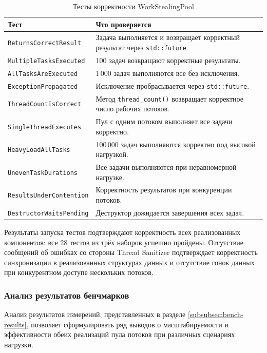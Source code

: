 \begin{table}[h]
\caption{Тесты корректности WorkStealingPool}
\label{tab:tests-ws}
\begin{tabularx}{\textwidth}{|l|X|}
\hline
Тест & Что проверяется \\
\hline
\texttt{ReturnsCorrectResult} &
Задача выполняется и возвращает корректный результат
через \texttt{std::future}. \\
\hline
\texttt{MultipleTasksExecuted} &
100 задач возвращают корректные результаты. \\
\hline
\texttt{AllTasksAreExecuted} &
1\,000 задач выполняются все без исключения. \\
\hline
\texttt{ExceptionPropagated} &
Исключение пробрасывается через \texttt{std::future}. \\
\hline
\texttt{ThreadCountIsCorrect} &
Метод \texttt{thread\_count()} возвращает корректное
число рабочих потоков. \\
\hline
\texttt{SingleThreadExecutes} &
Пул с одним потоком выполняет все задачи корректно. \\
\hline
\texttt{HeavyLoadAllTasks} &
100\,000 задач выполняются корректно под высокой
нагрузкой. \\
\hline
\texttt{UnevenTaskDurations} &
Все задачи выполняются при неравномерной нагрузке. \\
\hline
\texttt{ResultsUnderContention} &
Корректность результатов при конкуренции потоков. \\
\hline
\texttt{DestructorWaitsPending} &
Деструктор дожидается завершения всех задач. \\
\hline
\end{tabularx}
\end{table}

Результаты запуска тестов подтверждают корректность всех
реализованных компонентов: все 28 тестов из трёх наборов
успешно пройдены. Отсутствие сообщений об ошибках со стороны
Thread Sanitizer подтверждает корректность синхронизации
в реализованных структурах данных и отсутствие гонок данных
при конкурентном доступе нескольких потоков.

\subsubsection{Анализ результатов бенчмарков}

Анализ результатов измерений, представленных в разделе \ref{subsubsec:bench-results},
позволяет сформулировать ряд выводов о масштабируемости и
эффективности обеих реализаций пула потоков при различных
сценариях нагрузки.

